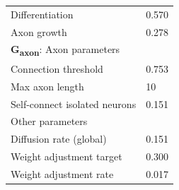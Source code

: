 \begin{table}[ht]
\begin{tabular}{ll}
\quad Differentiation & 0.570 \\
\quad Axon growth & 0.278 \\
\midrule
\textbf{G\textsubscript{axon}}: Axon parameters & \\
\quad Connection threshold & 0.753 \\
\quad Max axon length & 10 \\
\quad Self-connect isolated neurons & 0.151 \\
\midrule
Other parameters & \\
\quad Diffusion rate (global) & 0.151 \\
\quad Weight adjustment target & 0.300 \\
\quad Weight adjustment rate & 0.017 \\
\bottomrule
\end{tabular}
\end{table}